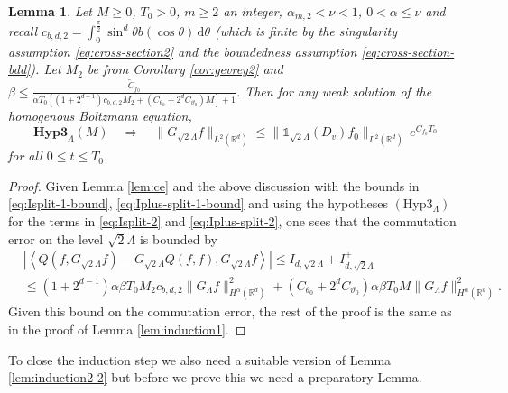 \documentclass[11pt,a4paper,reqno]{amsart}
\theoremstyle{plain}
\newtheorem{lemma}[proposition]{Lemma}
\theoremstyle{definition}
\begin{document}
\begin{lemma}\label{lem:induction1-3} Let $M\ge 0$, $T_0>0$, $m\ge 2$ an integer, $\alpha_{m,2}<\nu<1$,
	$0<\alpha \leq \nu$ and recall $c_{b,d,2} = \int_{0}^{\frac{\pi}{2}} \sin^d \theta b(\cos\theta)\,\mathrm{d}\theta$ (which is finite by the singularity assumption \eqref{eq:cross-section2} and the boundedness assumption \eqref{eq:cross-section-bdd}).
	Let $M_2$ be from Corollary \ref{cor:gevrey2} and
 $\beta\le \frac{\tilde{C}_{f_0}}{\alpha T_0[(1+2^{d-1}) c_{b,d,2} M_2 + (C_{\theta_0}+2^d C_{\vartheta_0})M]  +1}$. Then for any weak solution of the homogenous Boltzmann equation,
	\begin{equation} \label{eq:inductionbound1-3}
		\mathbf{Hyp3}_{\Lambda}(M) \quad \Rightarrow \quad \|G_{\sqrt{2}\Lambda} f \|_{L^2({\mathbb{R}}^d)} \le \|{\mathds{1}}_{\sqrt{2}\Lambda}(D_v) f_0\|_{L^2({\mathbb{R}}^d)} \, e^{C_{f_0}T_0}
	\end{equation}
	for all $0\le t\le T_0$.
\end{lemma}
\begin{proof}
	Given Lemma \ref{lem:ce} and the above discussion with the bounds in \eqref{eq:Isplit-1-bound}, \eqref{eq:Iplus-split-1-bound} and using the hypotheses $(\mathrm{Hyp}3_{\Lambda})$ for the terms in \eqref{eq:Isplit-2} and \eqref{eq:Iplus-split-2}, one sees that the commutation error on the level $\sqrt{2}\Lambda$ is bounded by
	\begin{align*}
		&\left| \left\langle Q(f, G_{\sqrt{2}\Lambda}f) - G_{\sqrt{2}\Lambda} Q(f,f), G_{\sqrt{2}\Lambda}f\right\rangle\right| \leq I_{d,\sqrt{2}\Lambda} + I_{d, \sqrt{2}\Lambda}^+ \\
		&\le  (1+2^{d-1})\alpha \beta T_0   M_2 c_{b,d,2} \|G_\Lambda f\|_{H^\alpha({\mathbb{R}}^d)}^2
			+ (C_{\theta_0}+ 2^d C_{\vartheta_0}) \alpha \beta T_0  M \|G_\Lambda f\|_{H^\alpha({\mathbb{R}}^d)}^2  .
	\end{align*}
	Given this bound on the commutation error, the rest of the proof is the same as in the proof of Lemma \ref{lem:induction1}.
\end{proof}

To close the induction step we also need a suitable version of Lemma \ref{lem:induction2-2} but before we prove this we need a preparatory Lemma.
\end{document}
